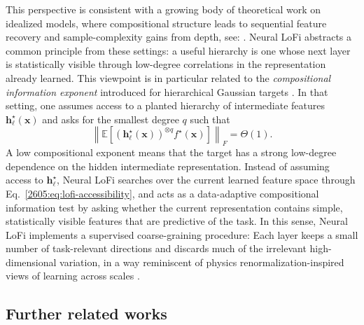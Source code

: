 This perspective is consistent with a growing body of theoretical work on idealized models, where compositional structure leads to sequential feature recovery and sample-complexity gains from depth, see:
\cite{cagnetta2024how,favero2021locality,favero2025how,garnierbrun2025how,dandi2026computational,tabanelli2026deep,ren2026provable,cagnetta2026deriving}. Neural LoFi abstracts a common principle from these settings: a useful hierarchy is one whose next layer is statistically visible through low-degree correlations in the representation already learned. This viewpoint is in particular related to the {\it compositional information exponent} introduced for hierarchical Gaussian targets
\cite{dandi2026computational}. In that setting, one assumes access to a planted hierarchy of intermediate features $\bm h_\ell^\star(\bm x)$ and asks for the smallest degree $q$ such that
\begin{equation}
\left\|
\mathbb E
\left[
(\bm h_\ell^\star(\bm x))^{\otimes q}
f^\star(\bm x)
\right]
\right\|_F
=
\Theta(1).
\label{2605:eq:cie-planted}
\end{equation}
A low compositional exponent means that the target has a strong low-degree dependence on the hidden intermediate representation. Instead of assuming access to $\bm h_\ell^\star$, Neural LoFi searches over the current learned feature space through Eq.~\eqref{2605:eq:lofi-accessibility}, and acts as a data-adaptive compositional information test by asking whether the current representation contains simple, statistically visible features that are predictive of the task.
In this sense, Neural LoFi implements a supervised coarse-graining procedure: Each layer keeps a small number of task-relevant directions and discards much of the irrelevant high-dimensional variation, in a way reminiscent of  physics renormalization-inspired views of learning across scales
\cite{wilson1983renormalization}. 



\subsection{Further related works}

